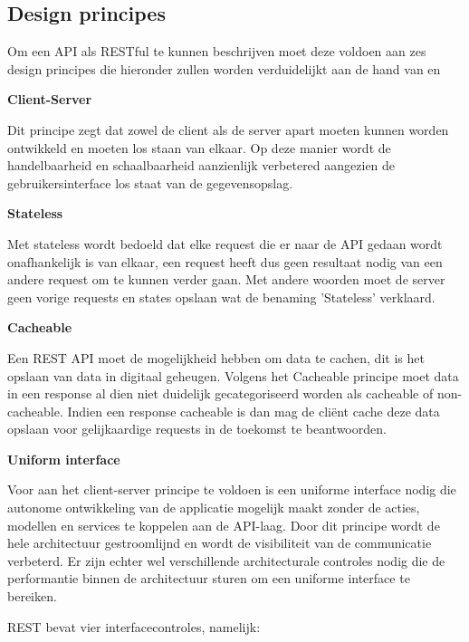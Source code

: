 \subsection{Design principes}
\label{subsec:Design principes}

Om een API als RESTful te kunnen beschrijven moet deze voldoen aan zes design principes die hieronder zullen worden verduidelijkt aan de hand van \autocite{Long} en \autocite{Naeem2021}

\textbf{Client-Server}

Dit principe zegt dat zowel de client als de server apart moeten kunnen worden ontwikkeld en moeten los staan van elkaar. Op deze manier wordt de handelbaarheid en schaalbaarheid aanzienlijk verbetered aangezien de gebruikersinterface los staat van de gegevensopslag.


\textbf{Stateless}

Met stateless wordt bedoeld dat elke request die er naar de API gedaan wordt onafhankelijk is van elkaar, een request heeft dus geen resultaat nodig van een andere request om te kunnen verder gaan. Met andere woorden moet de server geen vorige requests en states opslaan wat de benaming 'Stateless' verklaard.


\textbf{Cacheable}

Een REST API moet de mogelijkheid hebben om data te cachen, dit is het opslaan van data in digitaal geheugen. Volgens het Cacheable principe moet data in een response al dien niet duidelijk gecategoriseerd worden als cacheable of non-cacheable. Indien een response cacheable is dan mag de cliënt cache deze data opslaan voor gelijkaardige requests in de toekomst te beantwoorden.

\textbf{Uniform interface}

Voor aan het client-server principe te voldoen is een uniforme interface nodig die autonome ontwikkeling van de applicatie mogelijk maakt zonder de acties, modellen en services te koppelen aan de API-laag. Door dit principe wordt de hele architectuur gestroomlijnd en wordt de visibiliteit van de communicatie verbeterd. Er zijn echter wel verschillende architecturale controles nodig die de performantie binnen de architectuur sturen om een uniforme interface te bereiken.

REST bevat vier interfacecontroles, namelijk: 

